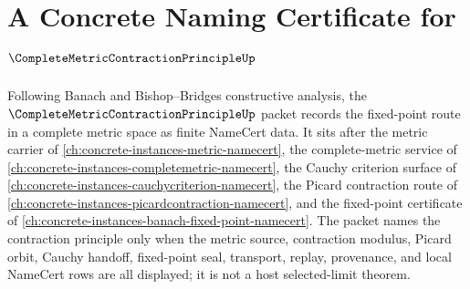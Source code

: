 \chapter{A Concrete Naming Certificate for $\CompleteMetricContractionPrincipleUp$}
\label{ch:concrete-instances-complete-metric-contraction-principle-namecert}

Following Banach and Bishop--Bridges constructive analysis, the $\CompleteMetricContractionPrincipleUp$ packet records the fixed-point route in a complete metric space as finite NameCert data. It sits after the metric carrier of \autoref{ch:concrete-instances-metric-namecert}, the complete-metric service of \autoref{ch:concrete-instances-completemetric-namecert}, the Cauchy criterion surface of \autoref{ch:concrete-instances-cauchycriterion-namecert}, the Picard contraction route of \autoref{ch:concrete-instances-picardcontraction-namecert}, and the fixed-point certificate of \autoref{ch:concrete-instances-banach-fixed-point-namecert}. The packet names the contraction principle only when the metric source, contraction modulus, Picard orbit, Cauchy handoff, fixed-point seal, transport, replay, provenance, and local NameCert rows are all displayed; it is not a host selected-limit theorem.


